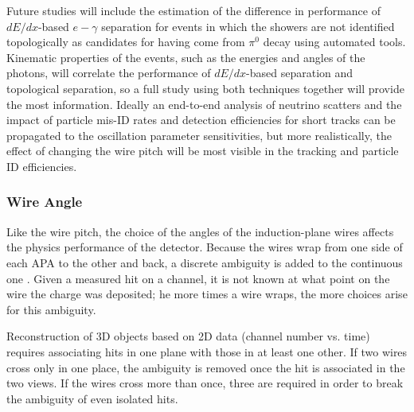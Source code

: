 Future studies will include the estimation of the difference in
performance of $dE/dx$-based $e-\gamma$ separation for events in which
the showers are not identified topologically as candidates for having
come from $\pi^0$ decay using automated tools.  
%
Kinematic properties
of the events, such as the energies and angles of the photons, will 
correlate the performance of $dE/dx$-based separation and topological
separation, so a full study using both techniques together will
provide the most information.  Ideally an end-to-end analysis of
neutrino scatters and the impact of particle mis-ID rates and
detection efficiencies for short tracks can be propagated to the
oscillation parameter sensitivities, but more realistically, the
effect of changing the wire pitch will be most visible in the tracking
and particle ID efficiencies.


\subsubsection{Wire Angle}
\label{v4:fd-ref-wireangle}

Like the wire pitch, the choice of the angles of the induction-plane
wires  affects the physics performance of the detector.  Because the
wires wrap from one side of each APA to the other and back, a discrete
ambiguity is added to the continuous one .
Given a measured hit on a channel, it is not known at what point on the wire the charge was
deposited; he more times a wire wraps, the more choices arise for this
ambiguity.

Reconstruction of 3D objects based on 2D
 data (channel number vs. time) requires associating hits in one plane
with those in at least one other. %
If two wires cross only
in one place, %
the ambiguity is removed once the hit is associated in the
two views.  If the wires cross more than once, three  are required in order to
break the ambiguity of even isolated hits.

